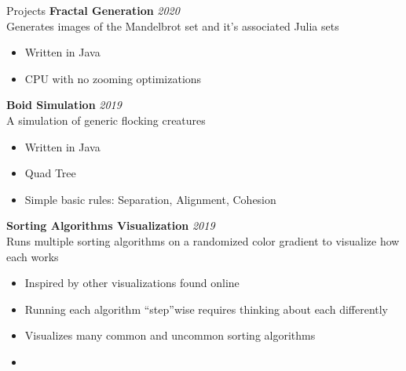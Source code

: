 \begin{rSection}{Projects}
		{\bf Fractal Generation}{} \hfill {\em 2020}\\
		Generates images of the Mandelbrot set and it's associated Julia sets
		\begin{multicols}{2}
			\begin{itemize}
				\item Written in Java
				\item CPU with no zooming optimizations
			\end{itemize}
		\end{multicols}

		{\bf Boid Simulation}{} \hfill {\em 2019}\\
		A simulation of generic flocking creatures
		\begin{multicols}{2}
			\begin{itemize}
				\item Written in Java
				\item Quad Tree
				\item Simple basic rules: Separation, Alignment, Cohesion
			\end{itemize}
		\end{multicols}

		{\bf Sorting Algorithms Visualization}{} \hfill {\em 2019}\\
		Runs multiple sorting algorithms on a randomized color gradient to visualize how each works
		\begin{multicols}{2}
			\begin{itemize}
				\item Inspired by other visualizations found online
				\item Running each algorithm ``step''wise requires thinking about each differently
				\item Visualizes many common and uncommon sorting algorithms
				\item[\vspace{\fill}] %
			\end{itemize}
		\end{multicols}
		

\end{rSection}
